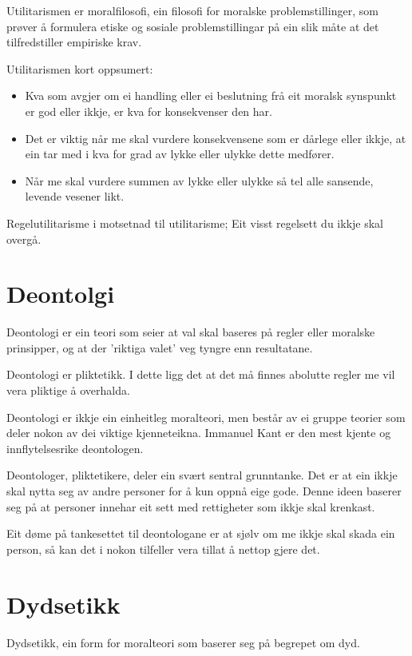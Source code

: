 \documentclass[a4paper]{IEEEtran}
\begin{document}
Utilitarismen er moralfilosofi, ein filosofi for moralske problemstillinger, som prøver å formulera etiske og sosiale problemstillingar på ein slik måte at det tilfredstiller empiriske krav.
\bigskip

Utilitarismen kort oppsumert:\bigskip
\begin{itemize}
    \item Kva som avgjer om ei handling eller ei beslutning frå eit moralsk synspunkt er god eller ikkje, er kva for konsekvenser den har.
    \item Det er viktig når me skal vurdere konsekvensene som er dårlege eller ikkje, at ein tar med i kva for grad av lykke eller ulykke dette medfører.
    \item Når me skal vurdere summen av lykke eller ulykke så tel alle sansende, levende vesener likt. 
\end{itemize}\bigskip

Regelutilitarisme i motsetnad til utilitarisme; Eit visst regelsett du ikkje skal overgå.

\bigskip
\section{Deontolgi}
\label{deontologi}

Deontologi er ein teori som seier at val skal baseres på regler eller moralske prinsipper, og at der 'riktiga valet' veg tyngre enn resultatane.

Deontologi er pliktetikk. I dette ligg det at det må finnes abolutte regler me vil vera pliktige å overhalda. 

Deontologi er ikkje ein einheitleg moralteori, men består av ei gruppe teorier som deler nokon av dei viktige kjenneteikna. Immanuel Kant er den mest kjente og innflytelsesrike deontologen.

Deontologer, pliktetikere, deler ein svært sentral grunntanke. Det er at ein ikkje skal nytta seg av andre personer for å kun oppnå eige gode. Denne ideen baserer seg på at personer innehar eit sett med rettigheter som ikkje skal krenkast. 

Eit døme på tankesettet til deontologane er at sjølv om me ikkje skal skada ein person, så kan det i nokon tilfeller vera tillat å nettop gjere det. 
\section{Dydsetikk}
\label{dydsetikk}\bigskip

Dydsetikk, ein form for moralteori som baserer seg på begrepet om dyd.\newline
\end{document}
